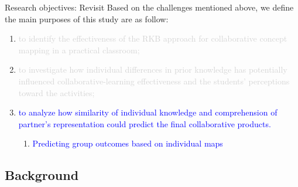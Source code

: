 \begin{frame}{Research objectives: Revisit}
    Based on the challenges mentioned above, we define the main purposes of this study are as follow: 
    \begin{enumerate}[A]
        \item \textcolor{lightgray}{to identify the effectiveness of the RKB approach for collaborative concept mapping in a practical classroom;}
        
        \item \textcolor{lightgray}{to investigate how individual differences in prior knowledge has potentially influenced collaborative-learning effectiveness and the students' perceptions toward the activities;} 
        
        \item \textcolor{blue}{to analyze how similarity of individual knowledge and comprehension  of partner's representation could predict the final collaborative products.}
        \begin{enumerate}[4]
            \item \textcolor{blue}{Predicting group outcomes based on individual maps}
        \end{enumerate}
    \end{enumerate} 
\end{frame}

\subsection{Background}

